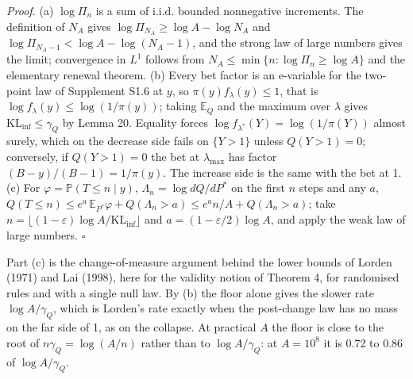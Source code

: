 \documentclass[
]{article}
\begin{document}
\emph{Proof.} (a) \(\log \Pi_n\) is a sum of i.i.d. bounded nonnegative
increments. The definition of \(N_A\) gives
\(\log \Pi_{N_A} \ge \log A - \log N_A\) and
\(\log \Pi_{N_A - 1} < \log A - \log(N_A - 1)\), and the strong law of
large numbers gives the limit; convergence in \(L^1\) follows from
\(N_A \le \min\lbrace n : \log \Pi_n \ge \log A\rbrace\) and the
elementary renewal theorem. (b) Every bet factor is an e-variable for
the two-point law of Supplement S1.6 at \(y\), so
\(\pi(y) f_\lambda(y) \le 1\), that is
\(\log f_\lambda(y) \le \log(1/\pi(y))\); taking \(\mathbb{E}_Q\) and
the maximum over \(\lambda\) gives \(\mathrm{KL}_{\inf} \le \gamma_Q\)
by Lemma 20. Equality forces
\(\log f_{\lambda^\ast}(Y) = \log(1/\pi(Y))\) almost surely, which on
the decrease side fails on \(\lbrace Y > 1\rbrace\) unless
\(Q(Y > 1) = 0\); conversely, if \(Q(Y > 1) = 0\) the bet at
\(\lambda_{\max}\) has factor \((B - y)/(B-1) = 1/\pi(y)\). The increase
side is the same with the bet at 1. (c) For
\(\varphi = \mathbb{P}(T \le n \mid y)\),
\(\Lambda_n = \log dQ/dP^\ast\) on the first \(n\) steps and any \(a\),
\(Q(T \le n) \le e^{a}\,\mathbb{E}_{P^\ast}\varphi + Q(\Lambda_n > a) \le e^{a} n/A + Q(\Lambda_n > a)\);
take \(n = \lfloor(1-\varepsilon)\log A/\mathrm{KL}_{\inf}\rfloor\) and
\(a = (1 - \varepsilon/2)\log A\), and apply the weak law of large
numbers. \(\square\)

Part (c) is the change-of-measure argument behind the lower bounds of
Lorden (1971) and Lai (1998), here for the validity notion of Theorem 4,
for randomised rules and with a single null law. By (b) the floor alone
gives the slower rate \(\log A/\gamma_Q\), which is Lorden's rate
exactly when the post-change law has no mass on the far side of 1, as on
the collapse. At practical \(A\) the floor is close to the root of
\(n\gamma_Q = \log(A/n)\) rather than to \(\log A/\gamma_Q\): at
\(A = 10^8\) it is 0.72 to 0.86 of \(\log A/\gamma_Q\).
\end{document}
